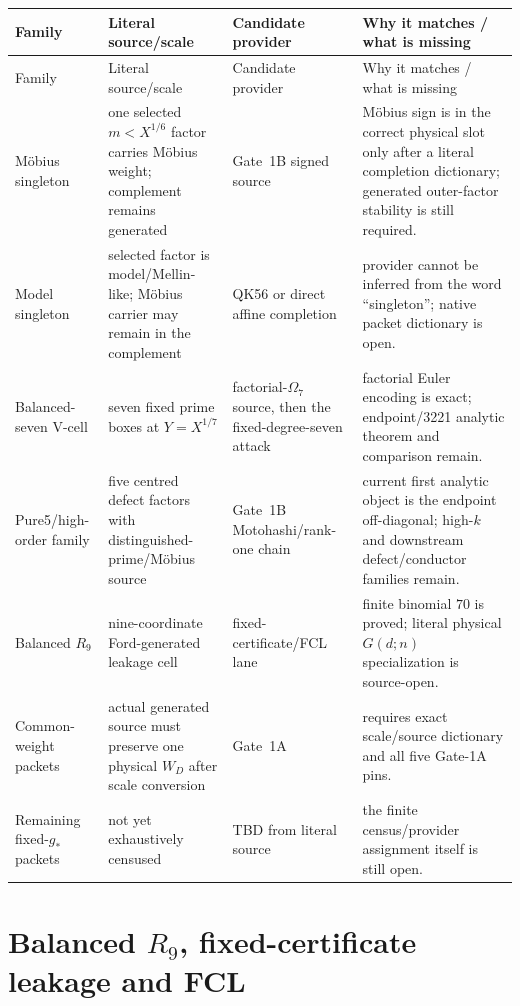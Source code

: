 \documentclass[11pt]{article}
\theoremstyle{definition}
\newcommand{\1}{\mathbf 1}
\begin{document}
\begin{longtable}{p{}p{}p{}p{}}
\toprule
Family & Literal source/scale & Candidate provider & Why it matches / what is missing\\
\midrule
\endfirsthead
\toprule
Family & Literal source/scale & Candidate provider & Why it matches / what is missing\\
\midrule
\endhead
M\"obius singleton &
one selected $m<X^{1/6}$ factor carries M\"obius weight; complement remains generated &
Gate~1B signed source &
M\"obius sign is in the correct physical slot only after a literal completion dictionary;
generated outer-factor stability is still required.\\
Model singleton &
selected factor is model/Mellin-like; M\"obius carrier may remain in the complement &
QK56 or direct affine completion &
provider cannot be inferred from the word ``singleton''; native packet dictionary is open.\\
Balanced-seven V-cell &
seven fixed prime boxes at $Y=X^{1/7}$ &
factorial-$\Omega_7$ source, then the fixed-degree-seven attack &
factorial Euler encoding is exact; endpoint/3221 analytic theorem and comparison remain.\\
Pure5/high-order family &
five centred defect factors with distinguished-prime/M\"obius source &
Gate~1B Motohashi/rank-one chain &
current first analytic object is the endpoint off-diagonal; high-$k$ and downstream
defect/conductor families remain.\\
Balanced $R_9$ &
nine-coordinate Ford-generated leakage cell &
fixed-certificate/FCL lane &
finite binomial $70$ is proved; literal physical $G(d;n)$ specialization is source-open.\\
Common-weight packets &
actual generated source must preserve one physical $W_D$ after scale conversion &
Gate~1A &
requires exact scale/source dictionary and all five Gate-1A pins.\\
Remaining fixed-$g_\ast$ packets &
not yet exhaustively censused &
TBD from literal source &
the finite census/provider assignment itself is still open.\\
\bottomrule
\end{longtable}

\section{Balanced $R_9$, fixed-certificate leakage and FCL}
\label{sec:r9-fcl-theory}
\end{document}
